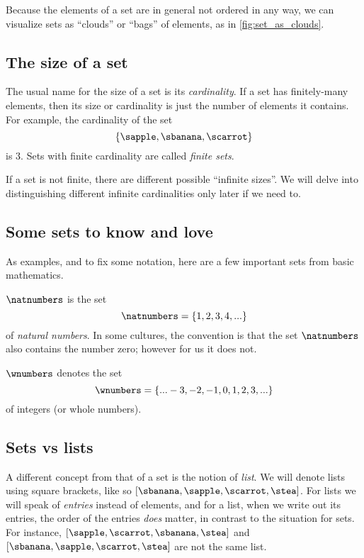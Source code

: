 Because the elements of a set are in general not ordered in any way, we can visualize sets as ``clouds'' or ``bags'' of elements, as in \cref{fig:set_as_clouds}.

\subsection{The size of a set}

The usual name for the size of a set is its \emph{cardinality}. If a set has finitely-many elements, then its size or cardinality is just the number of elements it contains. For example, the cardinality of the set
\begin{equation}
\{ \sapple, \sbanana, \scarrot \}
\end{equation}
is $3$. Sets with finite cardinality are called \emph{finite sets}. 

If a set is not finite, there are different possible ``infinite sizes''. We will delve into distinguishing different infinite cardinalities only later if we need to.

\subsection{Some sets to know and love}

As examples, and to fix some notation, here are a few important sets from basic mathematics. 

$\natnumbers$ is the set
\begin{equation}
\natnumbers = \{1, 2, 3, 4, ... \}
\end{equation}
of \emph{natural numbers}. In some cultures, the convention is that the set $\natnumbers$ also contains the number zero; however for us it does not. 

$\wnumbers$ denotes the set
\begin{equation}
\wnumbers = \{... -3, -2, -1, 0, 1, 2, 3, ... \}
\end{equation}
of integers (or whole numbers). 
 


\subsection{Sets vs lists}

A different concept from that of a set is the notion of \emph{list}.
We will denote lists using square brackets, like so $[\sbanana, \sapple, \scarrot, \stea]$. 
For lists we will speak of \emph{entries} instead of elements, and for a list, when we write out its entries, the order of the entries \emph{does} matter, in contrast to the situation for sets.
For instance, $[ \sapple, \scarrot, \sbanana, \stea]$ and $[\sbanana, \sapple, \scarrot, \stea]$ are not the same list.

